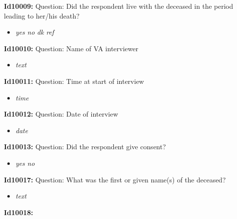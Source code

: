 \documentclass{article}%
\begin{document}
\textbf{Id10009: \newline%
}%
Question: Did the respondent live with the deceased in the period leading to her/his death?\newline%
%
\begin{itemize}%
\item%
\textit{yes\newline%
 no\newline%
 dk\newline%
 ref\newline%
}%
\end{itemize}%
\textbf{Id10010: \newline%
}%
Question: Name of VA interviewer\newline%
%
\begin{itemize}%
\item%
\textit{text\newline%
}%
\end{itemize}%
\textbf{Id10011: \newline%
}%
Question: Time at start of interview\newline%
%
\begin{itemize}%
\item%
\textit{time\newline%
}%
\end{itemize}%
\textbf{Id10012: \newline%
}%
Question: Date of interview\newline%
%
\begin{itemize}%
\item%
\textit{date\newline%
}%
\end{itemize}%
\textbf{Id10013: \newline%
}%
Question: Did the respondent give consent?\newline%
%
\begin{itemize}%
\item%
\textit{yes\newline%
 no\newline%
}%
\end{itemize}%
\textbf{Id10017: \newline%
}%
Question: What was the first or given name(s) of the deceased?\newline%
%
\begin{itemize}%
\item%
\textit{text\newline%
}%
\end{itemize}%
\textbf{Id10018: \newline%
}%
\end{document}
